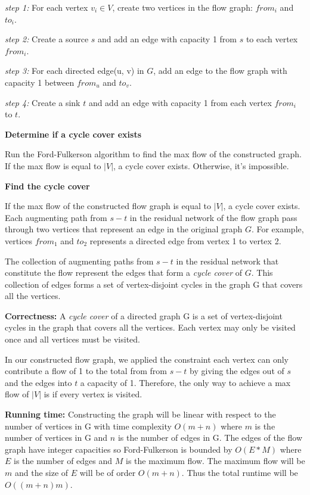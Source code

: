 \documentclass[11pt]{article}
\newcommand\correctness{\vspace{.10in}\textbf{Correctness: }}
\newcommand\runtime{\vspace{.10in}\textbf{Running time: }}
\begin{document}
\textit{step 1:} For each vertex $v_i \in V$, create two vertices in the flow graph: $from_i$ and $to_i$.

\textit{step 2:} Create a source $s$ and add an edge with capacity 1 from $s$ to each vertex $from_i$. 

\textit{step 3:} For each directed edge(u, v) in $G$, add an edge to the flow graph with capacity 1 between $from_u$ and $to_v$.

\textit{step 4: } Create a sink $t$ and add an edge with capacity 1 from each vertex $from_i$ to $t$.

\textbf{Determine if a cycle cover exists} 

Run the Ford-Fulkerson algorithm to find the max flow of the constructed graph. If the max flow is equal to $|V|$, a cycle cover exists. Otherwise, it's impossible.

\textbf{Find the cycle cover}

If the max flow of the constructed flow graph is equal to $|V|$, a cycle cover exists. Each augmenting path from $s-t$ in the residual network of the flow graph pass through two vertices that represent an edge in the original graph $G$. For example, vertices $from_1$ and $to_2$ represents a directed edge from vertex 1 to vertex 2. 

The collection of augmenting paths from $s-t$ in the residual network that constitute the flow represent the edges that form a \textit{cycle cover} of $G$. This collection of edges forms a set of vertex-disjoint cycles in the graph G that covers all the vertices.

\correctness A \textit{cycle cover} of a directed graph G is a set of vertex-disjoint cycles in the graph that covers all the vertices. Each vertex may only be visited once and all vertices must be visited. 

In our constructed flow graph, we applied the constraint each vertex can only contribute a flow of 1 to the total from from $s-t$ by giving the edges out of $s$ and the edges into $t$ a capacity of 1. Therefore, the only way to achieve a max flow of $|V|$ is if every vertex is visited. 

\runtime Constructing the graph will be linear with respect to the number of vertices in G with time complexity $O(m + n)$ where $m$ is the number of vertices in G and $n$ is the number of edges in G. The edges of the flow graph have integer capacities so Ford-Fulkerson is bounded by $O(E * M)$ where $E$ is the number of edges and $M$ is the maximum flow. The maximum flow will be $m$ and the size of $E$ will be of order $O(m + n)$. Thus the total runtime will be $O((m + n)m)$.
\end{document}
